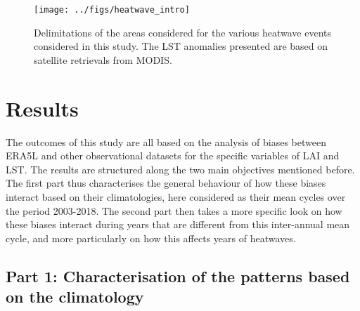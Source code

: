 \documentclass[gmd, manuscript]{copernicus}
\begin{document}
\begin{figure}[H]
\begin{center}
\texttt{[image: ../figs/heatwave\_intro]}
\caption{{Delimitations of the areas considered for the various heatwave events
considered in this study. The LST anomalies presented are based on
satellite retrievals from MODIS.
{\label{946697}}%
}}
\end{center}
\end{figure}



\section{Results}


The outcomes of this study are all based on the analysis of biases
between ERA5L and other observational datasets for the specific
variables of LAI and LST. The results are structured along the two main
objectives mentioned before. The first part thus characterises the
general behaviour of how these biases interact based on their
climatologies, here considered as their mean cycles over the period
2003-2018. The second part then takes a more specific look on how these
biases interact during years that are different from this inter-annual
mean cycle, and more particularly on how this affects years of
heatwaves.

\par\null

\subsection*{Part 1: Characterisation of the patterns based on the
climatology}

{\label{835449}}
\end{document}
